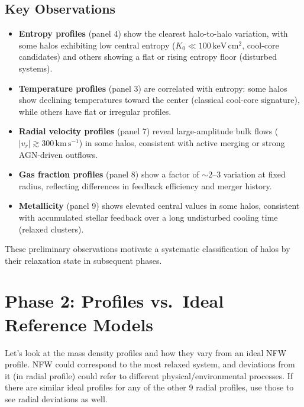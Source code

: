 \documentclass[12pt,a4paper]{article}
\begin{document}
\subsection{Key Observations}

\begin{itemize}
  \item \textbf{Entropy profiles} (panel 4) show the clearest halo-to-halo
        variation, with some halos exhibiting low central entropy
        ($K_0 \ll 100\,\mathrm{keV\,cm^2}$, cool-core candidates) and others
        showing a flat or rising entropy floor (disturbed systems).
  \item \textbf{Temperature profiles} (panel 3) are correlated with entropy:
        some halos show declining temperatures toward the center (classical
        cool-core signature), while others have flat or irregular profiles.
  \item \textbf{Radial velocity profiles} (panel 7) reveal large-amplitude
        bulk flows ($|v_r| \gtrsim 300\,\mathrm{km\,s^{-1}}$) in some halos,
        consistent with active merging or strong AGN-driven outflows.
  \item \textbf{Gas fraction profiles} (panel 8) show a factor of $\sim2$--$3$
        variation at fixed radius, reflecting differences in feedback efficiency
        and merger history.
  \item \textbf{Metallicity} (panel 9) shows elevated central values in some
        halos, consistent with accumulated stellar feedback over a long
        undisturbed cooling time (relaxed clusters).
\end{itemize}

These preliminary observations motivate a systematic classification of halos
by their relaxation state in subsequent phases.

\section{Phase 2: Profiles vs.\ Ideal Reference Models}
\label{sec:phase2}

\begin{querybox}
\textcolor{red!80!black}{%
Let's look at the mass density profiles and how they vary from an ideal NFW profile.
NFW could correspond to the most relaxed system, and deviations from it (in radial profile)
could refer to different physical/environmental processes. If there are similar ideal profiles
for any of the other 9 radial profiles, use those to see radial deviations as well.}
\end{querybox}
\end{document}

